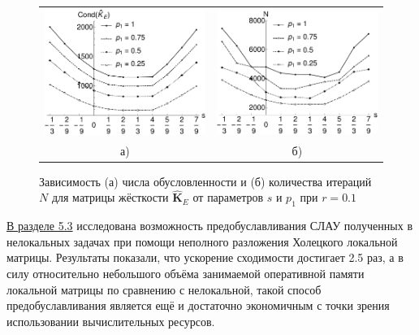 \begin{figure}[ht] \centering
	\begin{tabular}{cc}
		\includegraphics[width=0.4\linewidth]{pics/MechanicalCond.pdf} &
		\includegraphics[width=0.4\linewidth]{pics/MechanicalIter.pdf} \\
		а) & б)
	\end{tabular}
    \caption{Зависимость (а) числа обусловленности и (б) количества итераций $N$ для матрицы жёсткости $\widehat{\textbf{K}}_E$ от параметров $s$ и $p_1$ при $r = 0.1$}
    \label{fig:MechanicalCondAndIter}
\end{figure}


\underline{В разделе 5.3} исследована возможность предобуславливания СЛАУ полученных в нелокальных задачах при помощи неполного разложения Холецкого локальной матрицы. Результаты показали, что ускорение сходимости достигает 2.5 раз, а в силу относительно небольшого объёма занимаемой оперативной памяти локальной матрицы по сравнению с нелокальной, такой способ предобуславливания является ещё и достаточно экономичным с точки зрения использовании вычислительных ресурсов.

